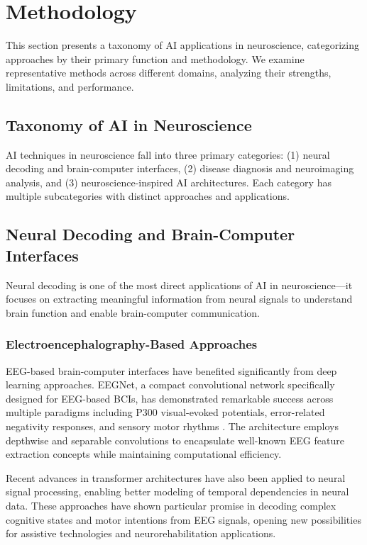 \documentclass[conference]{IEEEtran}
\begin{document}
\section{Methodology}

This section presents a taxonomy of AI applications in neuroscience, categorizing approaches by their primary function and methodology. We examine representative methods across different domains, analyzing their strengths, limitations, and performance.

\subsection{Taxonomy of AI in Neuroscience}

AI techniques in neuroscience fall into three primary categories: (1) neural decoding and brain-computer interfaces, (2) disease diagnosis and neuroimaging analysis, and (3) neuroscience-inspired AI architectures. Each category has multiple subcategories with distinct approaches and applications.

\subsection{Neural Decoding and Brain-Computer Interfaces}

Neural decoding is one of the most direct applications of AI in neuroscience—it focuses on extracting meaningful information from neural signals to understand brain function and enable brain-computer communication.

\subsubsection{Electroencephalography-Based Approaches}

EEG-based brain-computer interfaces have benefited significantly from deep learning approaches. EEGNet, a compact convolutional network specifically designed for EEG-based BCIs, has demonstrated remarkable success across multiple paradigms including P300 visual-evoked potentials, error-related negativity responses, and sensory motor rhythms \citep{lawhernEEGNetCompactConvolutional2018}. The architecture employs depthwise and separable convolutions to encapsulate well-known EEG feature extraction concepts while maintaining computational efficiency.

Recent advances in transformer architectures have also been applied to neural signal processing, enabling better modeling of temporal dependencies in neural data. These approaches have shown particular promise in decoding complex cognitive states and motor intentions from EEG signals, opening new possibilities for assistive technologies and neurorehabilitation applications.
\end{document}
